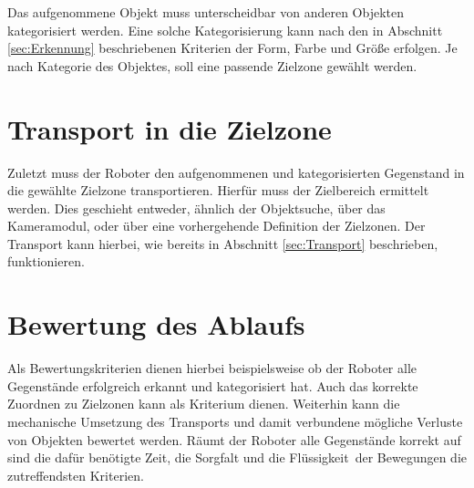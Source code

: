 Das aufgenommene Objekt muss unterscheidbar von anderen Objekten kategorisiert werden. Eine solche Kategorisierung kann nach den in Abschnitt \ref{sec:Erkennung} beschriebenen Kriterien der Form, Farbe und Größe erfolgen. Je nach Kategorie des Objektes, soll eine passende Zielzone gewählt werden.

\section{Transport in die Zielzone}

Zuletzt muss der Roboter den aufgenommenen und kategorisierten Gegenstand in die gewählte Zielzone transportieren. Hierfür muss der Zielbereich ermittelt werden. Dies geschieht entweder, ähnlich der Objektsuche, über das Kameramodul, oder über eine vorhergehende Definition der Zielzonen. Der Transport kann hierbei, wie bereits in Abschnitt \ref{sec:Transport} beschrieben, funktionieren. 

\section{Bewertung des Ablaufs}
\label{sec:Bewertung}

Als Bewertungskriterien dienen hierbei beispielsweise ob der Roboter alle Gegenstände erfolgreich erkannt und kategorisiert hat. Auch das korrekte Zuordnen zu Zielzonen kann als Kriterium dienen. Weiterhin kann die mechanische Umsetzung des Transports und damit verbundene mögliche Verluste von Objekten bewertet werden. Räumt der Roboter alle Gegenstände korrekt auf sind die dafür benötigte Zeit, die Sorgfalt und die \glqq Flüssigkeit\grqq\ der Bewegungen die zutreffendsten Kriterien.
